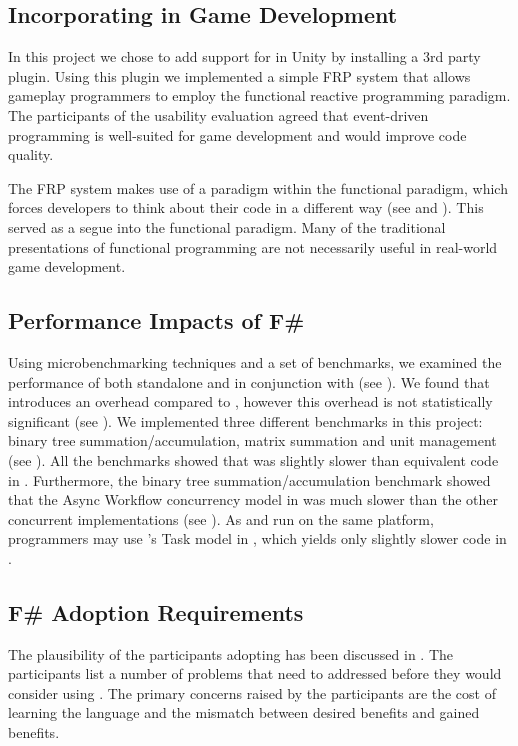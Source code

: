 \subsection{Incorporating \fs in Game Development}
In this project we chose to add support for \fs in Unity by installing a 3rd party plugin. Using this plugin we implemented a simple \gls{FRP} system that allows gameplay programmers to employ the functional reactive programming paradigm. The participants of the usability evaluation agreed that event-driven programming is well-suited for game development and would improve code quality.

The \gls{FRP} system makes use of a paradigm within the functional paradigm, which forces developers to think about their code in a different way (see  and ). This served as a segue into the functional paradigm. Many of the traditional presentations of functional programming are not necessarily useful in real-world game development.

\subsection{Performance Impacts of F\#}
Using microbenchmarking techniques and a set of benchmarks, we examined the performance of \fs both standalone and in conjunction with \unity (see ). We found that \fs introduces an overhead compared to \cs, however this overhead is not statistically significant (see ). We implemented three different benchmarks in this project: binary tree summation/accumulation, matrix summation and unit management (see ). All the benchmarks showed that \fs was slightly slower than equivalent code in \cs. Furthermore, the binary tree summation/accumulation benchmark showed that the Async Workflow concurrency model in \fs was much slower than the other concurrent implementations (see ). As \cs and \fs run on the same platform, programmers may use \cs's Task model in \fs, which yields only slightly slower code in \fs.

\subsection{F\# Adoption Requirements}
The plausibility of the participants adopting \fs has been discussed in . The participants list a number of problems that need to addressed before they would consider using \fs. The primary concerns raised by the participants are the cost of learning the language and the mismatch between desired benefits and gained benefits.

